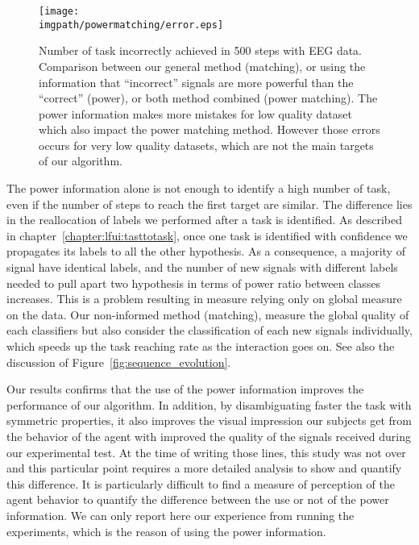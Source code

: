 \begin{figure}[!htbp]
\centering
\texttt{[image: \\imgpath/powermatching/error.eps]}
\caption{Number of task incorrectly achieved in 500 steps with EEG data. Comparison between our general method (matching), or using the information that ``incorrect'' signals are more powerful than the ``correct'' (power), or both method combined (power matching). The power information makes more mistakes for low quality dataset which also impact the power matching method. However those errors occurs for very low quality datasets, which are not the main targets of our algorithm.}
\label{fig:nWrongEEG_powermatching}
\end{figure} 


The power information alone is not enough to identify a high number of task, even if the number of steps to reach the first target are similar. The difference lies in the reallocation of labels we performed after a task is identified. As described in chapter~\ref{chapter:lfui:tasttotask}, once one task is identified with confidence we propagates its labels to all the other hypothesis. As a consequence, a majority of signal have identical labels, and the number of new signals with different labels needed to pull apart two hypothesis in terms of power ratio between classes increases. This is a problem resulting in measure relying only on global measure on the data. Our non-informed method (matching), measure the global quality of each classifiers but also consider the classification of each new signals individually, which speeds up the task reaching rate as the interaction goes on. See also the discussion of Figure~\ref{fig:sequence_evolution}.


Our results confirms that the use of the power information improves the performance of our algorithm. In addition, by disambiguating faster the task with symmetric properties, it also improves the visual impression our subjects get from the behavior of the agent with improved the quality of the signals received during our experimental test. At the time of writing those lines, this study was not over and this particular point requires a more detailed analysis to show and quantify this difference. It is particularly difficult to find a measure of perception of the agent behavior to quantify the difference between the use or not of the power information. We can only report here our experience from running the experiments, which is the reason of using the power information.

